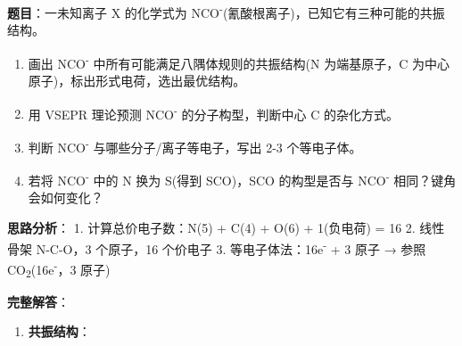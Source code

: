 \textbf{题目}：一未知离子 X 的化学式为 NCO\textsuperscript{-}(氰酸根离子)，已知它有三种可能的共振结构。

\begin{enumerate}
\def\labelenumi{(\arabic{enumi})}
\tightlist
\item
  画出 NCO\textsuperscript{-} 中所有可能满足八隅体规则的共振结构(N 为端基原子，C 为中心原子)，标出形式电荷，选出最优结构。
\item
  用 VSEPR 理论预测 NCO\textsuperscript{-} 的分子构型，判断中心 C 的杂化方式。
\item
  判断 NCO\textsuperscript{-} 与哪些分子/离子等电子，写出 2-3 个等电子体。
\item
  若将 NCO\textsuperscript{-} 中的 N 换为 S(得到 SCO)，SCO 的构型是否与 NCO\textsuperscript{-} 相同？键角会如何变化？
\end{enumerate}

\textbf{思路分析}：
1. 计算总价电子数：N(5) + C(4) + O(6) + 1(负电荷) = 16
2. 线性骨架 N-C-O，3 个原子，16 个价电子
3. 等电子体法：16e\textsuperscript{-} + 3 原子 → 参照 CO\textsubscript{2}(16e\textsuperscript{-}，3 原子)

\textbf{完整解答}：

\begin{enumerate}
\def\labelenumi{(\arabic{enumi})}
\tightlist
\item
  \textbf{共振结构}：
\end{enumerate}


